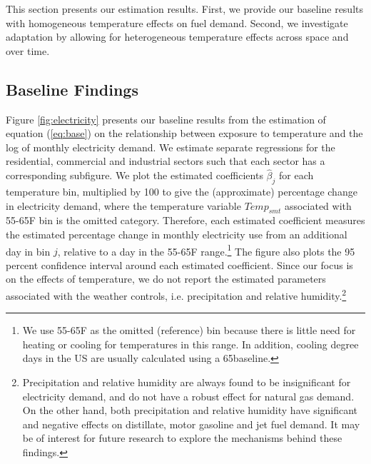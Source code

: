 \documentclass[11pt]{article}
\begin{document}
This section presents our estimation results. First, we provide our baseline results with homogeneous temperature effects on fuel demand. Second, we investigate adaptation by allowing for heterogeneous temperature effects across space and over time. %

\subsection{Baseline Findings}

Figure \ref{fig:electricity} presents our baseline results from the estimation of equation (\ref{eq:base}) on the relationship between exposure to temperature and the log of monthly electricity demand. We estimate separate regressions for the residential, commercial and industrial sectors such that each sector has a corresponding subfigure. We plot the estimated coefficients $\hat{\beta}_{j}$ for each temperature bin, multiplied by 100 to give the (approximate) percentage change in electricity demand, where the temperature variable $Temp_{smt}$ associated with 55-65\degree F bin is the omitted category. Therefore, each estimated coefficient measures the estimated percentage change in monthly electricity use from an additional day in bin $j$, relative to a day in the 55-65\degree F range.\footnote{ We use 55-65\degree F as the omitted (reference) bin because there is little need for heating or cooling for temperatures in this range. In addition, cooling degree days in the US are usually calculated using a 65\degree baseline.} The figure also plots the 95 percent confidence interval around each estimated coefficient. Since our focus is on the effects of temperature, we do not report the estimated parameters associated with the weather controls, i.e. precipitation and relative humidity.\footnote{ Precipitation and relative humidity are always found to be insignificant for electricity demand, and do not have a robust effect for natural gas demand. On the other hand, both precipitation and relative humidity have significant and negative effects on distillate, motor gasoline and jet fuel demand. It may be of interest for future research to explore the mechanisms behind these findings.}
\end{document}
